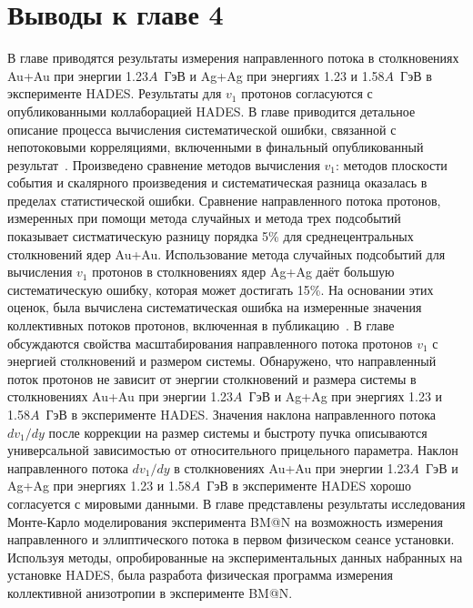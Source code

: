 \section{Выводы к главе 4}
В главе приводятся результаты измерения направленного потока в столкновениях Au+Au при энергии 1.23$A$~ГэВ и Ag+Ag при энергиях 1.23 и 1.58$A$~ГэВ в эксперименте HADES.
Результаты для $v_1$ протонов согласуются с опубликованными коллаборацией HADES.
В главе приводится детальное описание процесса вычисления систематической ошибки, связанной с непотоковыми корреляциями, включенными в финальный опубликованный результат~\cite{HADES:2020lob}.
Произведено сравнение методов вычисления $v_1$: методов плоскости события и скалярного произведения и систематическая разница оказалась в пределах статистической ошибки.
Сравнение направленного потока протонов, измеренных при помощи метода случайных и метода трех подсобытий показывает систматическую разницу порядка 5\% для среднецентральных столкновений ядер Au+Au.
Использование метода случайных подсобытий для вычисления $v_1$ протонов в столкновениях ядер Ag+Ag даёт большую систематическую ошибку, которая может достигать 15\%.
На основании этих оценок, была вычислена систематическая ошибка на измеренные значения коллективных потоков протонов, включенная в публикацию~\cite{HADES:2020lob}.
В главе обсуждаются свойства масштабирования направленного потока протонов $v_1$ с энергией столкновений и размером системы.
Обнаружено, что направленный поток протонов не зависит от энергии столкновений и размера системы в столкновениях Au+Au при энергии 1.23$A$~ГэВ и Ag+Ag при энергиях 1.23 и 1.58$A$~ГэВ в эксперименте HADES.
Значения наклона направленного потока $dv_1/dy$ после коррекции на размер системы и быстроту пучка описываются универсальной зависимостью от относительного прицельного параметра.
Наклон направленного потока $dv_1/dy$ в столкновениях Au+Au при энергии 1.23$A$~ГэВ и Ag+Ag при энергиях 1.23 и 1.58$A$~ГэВ в эксперименте HADES хорошо согласуется с мировыми данными.
В главе представлены результаты исследования Монте-Карло моделирования эксперимента BM@N на возможность измерения направленного и эллиптического потока в первом физическом сеансе установки.
Используя методы, опробированные на экспериментальных данных набранных на установке HADES, была разработа физическая программа измерения коллективной анизотропии в эксперименте BM@N.